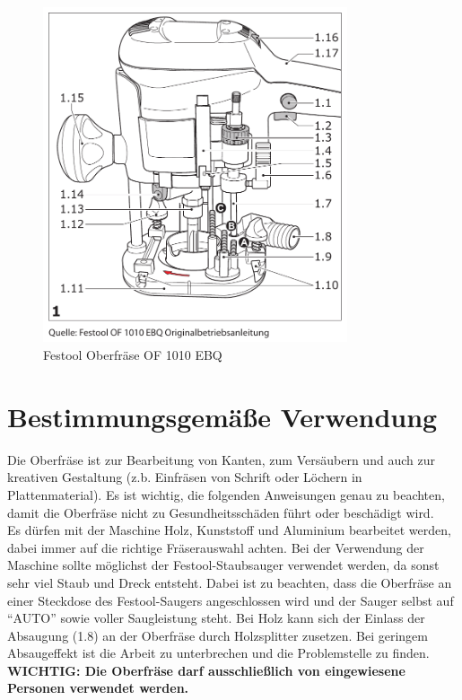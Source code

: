 \documentclass{\basedir/fablab-document}
\begin{document}
\begin{figure}[h!]
    \centering
    \includegraphics[width=0.8\textwidth]{bilder/oberfraese-sketch}
    \caption{Festool Oberfräse OF 1010 EBQ}
    \label{fig:sketch}
\end{figure}

\section{Bestimmungsgemäße Verwendung}
Die Oberfräse ist zur Bearbeitung von Kanten, zum Versäubern und auch zur kreativen Gestaltung (z.b. Einfräsen von Schrift oder Löchern in Plattenmaterial). Es ist wichtig, die folgenden Anweisungen genau zu beachten, damit die Oberfräse nicht zu Gesundheitsschäden führt oder beschädigt wird.\\
Es dürfen mit der Maschine Holz, Kunststoff und Aluminium bearbeitet werden, dabei immer auf die richtige Fräserauswahl achten. Bei der Verwendung der Maschine sollte möglichst der Festool-Staubsauger verwendet werden, da sonst sehr viel Staub und Dreck entsteht. Dabei ist zu beachten, dass die Oberfräse an einer Steckdose des Festool-Saugers angeschlossen wird und der Sauger selbst auf \enquote{AUTO} sowie voller Saugleistung steht. Bei Holz kann sich der Einlass der Absaugung (1.8) an der Oberfräse durch Holzsplitter zusetzen. Bei geringem Absaugeffekt ist die Arbeit zu unterbrechen und die Problemstelle zu finden.\\
\textbf{WICHTIG: Die Oberfräse darf ausschließlich von eingewiesene Personen verwendet werden.}
\end{document}

